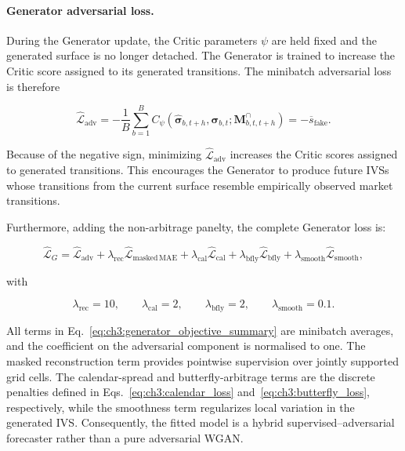 \paragraph*{Generator adversarial loss.}
During the Generator update, the Critic parameters $\psi$ are held fixed and
the generated surface is no longer detached. The Generator is trained to
increase the Critic score assigned to its generated transitions. The
minibatch adversarial loss is therefore

\begin{equation}\label{eq:ch3:generator_adversarial_loss}
\widehat{\mathcal{L}}_{\mathrm{adv}}
=
-
\frac{1}{B}
\sum_{b=1}^{B}
C_{\psi}
\left(
\widehat{\boldsymbol{\sigma}}_{b,t+h},
\boldsymbol{\sigma}_{b,t};
\mathbf{M}^{\cap}_{b,t,t+h}
\right)
=
-
\overline{s}_{\mathrm{fake}}.
\end{equation}

Because of the negative sign, minimizing
$\widehat{\mathcal{L}}_{\mathrm{adv}}$ increases the Critic scores assigned to
generated transitions. This encourages the Generator to produce future IVSs
whose transitions from the current surface resemble empirically observed
market transitions.

Furthermore, adding the non-arbitrage panelty, the complete Generator loss is:

\begin{equation}\label{eq:ch3:generator_objective_summary}
\widehat{\mathcal{L}}_{G}
=
\widehat{\mathcal{L}}_{\mathrm{adv}}
+
\lambda_{\mathrm{rec}}
\widehat{\mathcal{L}}_{\mathrm{masked\,MAE}}
+
\lambda_{\mathrm{cal}}
\widehat{\mathcal{L}}_{\mathrm{cal}}
+
\lambda_{\mathrm{bfly}}
\widehat{\mathcal{L}}_{\mathrm{bfly}}
+
\lambda_{\mathrm{smooth}}
\widehat{\mathcal{L}}_{\mathrm{smooth}},
\end{equation}

with

\begin{equation}
\lambda_{\mathrm{rec}}=10,
\qquad
\lambda_{\mathrm{cal}}=2,
\qquad
\lambda_{\mathrm{bfly}}=2,
\qquad
\lambda_{\mathrm{smooth}}=0.1.
\end{equation}

All terms in Eq.~\eqref{eq:ch3:generator_objective_summary} are minibatch
averages, and the coefficient on the adversarial component is normalised to
one. The masked reconstruction term provides pointwise supervision over jointly
supported grid cells. The calendar-spread and butterfly-arbitrage terms are
the discrete penalties defined in Eqs.~\eqref{eq:ch3:calendar_loss}
and~\eqref{eq:ch3:butterfly_loss}, respectively, while the smoothness term
regularizes local variation in the generated IVS. Consequently, the fitted
model is a hybrid supervised--adversarial forecaster rather than a pure
adversarial WGAN.





